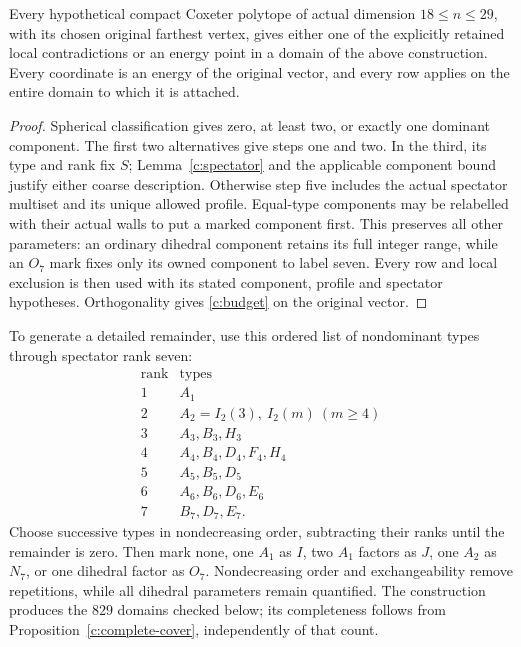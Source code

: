 \begin{proposition}
\label{c:complete-cover}
Every hypothetical compact Coxeter polytope of actual dimension
$18\le n\le29$, with its chosen original farthest vertex, gives either
one of the explicitly retained local contradictions or an energy point
in a domain of the above construction. Every coordinate is an energy
of the original vector, and every row applies on the entire domain to
which it is attached.
\end{proposition}
\begin{proof}
Spherical classification gives zero, at least two, or exactly one
dominant component. The first two alternatives give steps one and two.
In the third, its type and rank fix $S$; Lemma~\ref{c:spectator} and the
applicable component bound justify either coarse description.
Otherwise step five includes the actual spectator multiset and its
unique allowed profile. Equal-type components may be relabelled with
their actual walls to put a marked component first. This preserves all
other parameters: an ordinary dihedral component retains its full
integer range, while an $O_7$ mark fixes only its owned component to
label seven. Every row and local exclusion is then used with its stated
component, profile and spectator hypotheses. Orthogonality gives
\eqref{c:budget} on the original vector.
\end{proof}

To generate a detailed remainder, use this ordered list of nondominant
types through spectator rank seven:
\[
\begin{array}{c|l}
\text{rank}&\text{types}\\\hline
1&A_1\\
2&A_2=I_2(3),\ I_2(m)\ (m\ge4)\\
3&A_3,B_3,H_3\\
4&A_4,B_4,D_4,F_4,H_4\\
5&A_5,B_5,D_5\\
6&A_6,B_6,D_6,E_6\\
7&B_7,D_7,E_7.
\end{array}
\]
Choose successive types in nondecreasing order, subtracting their ranks
until the remainder is zero. Then mark none, one $A_1$ as $I$, two
$A_1$ factors as $J$, one $A_2$ as $N_7$, or one dihedral factor as
$O_7$. Nondecreasing order and exchangeability remove repetitions,
while all dihedral parameters remain quantified. The construction
produces the $829$ domains checked below; its completeness follows
from Proposition~\ref{c:complete-cover}, independently of that count.

